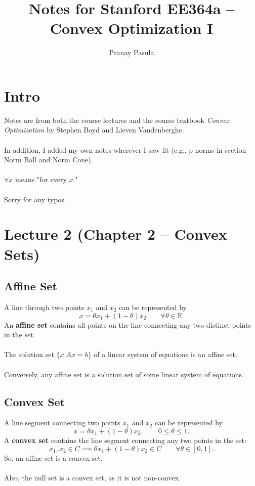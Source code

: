 \documentclass[]{article}
\title{Notes for Stanford EE364a -- Convex Optimization I}
\author{Pranay Pasula}
\date{}
\begin{document}
\maketitle

\section*{Intro}
Notes are from both the course lectures and the course textbook \textit{Convex Optimization} by Stephen Boyd and Lieven Vandenberghe.
\\\\
In addition, I added my own notes wherever I saw fit (e.g., p-norms in section Norm Ball and Norm Cone). 
\\\\ 
$\forall x$ means "for every $x$." 
\\\\
Sorry for any typos.
\\
\section*{Lecture 2 (Chapter 2 -- Convex Sets)}

\subsection*{Affine Set}
A line through two points $x_{1}$ and $x_{2}$ can be represented by $$x=\theta x_{1} + (1-\theta) x_{2} \qquad \forall \theta \in \mathbb{R}. $$
An \textbf{affine set} contains all points on the line connecting any two distinct points in the set. \\\\
The solution set $\{x|Ax=b\}$ of a linear system of equations is an affine set. \\\\
Conversely, any affine set is a solution set of some linear system of equations. \\

\subsection*{Convex Set}
A line segment connecting two points $x_{1}$ and $x_{2}$ can be represented by $$x=\theta x_{1} + (1-\theta) x_{2}, \qquad  0\leq \theta \leq 1.$$
A \textbf{convex set} contains the line segment connecting any two points in the set:  $$x_{1}, x_{2} \in C \implies \theta x_{1} + (1-\theta) x_{2} \in C \qquad \forall \theta \in [0,1].$$
So, an affine set is a convex set. \\\\
Also, the null set is a convex set, as it is not non-convex. \\
\end{document}
